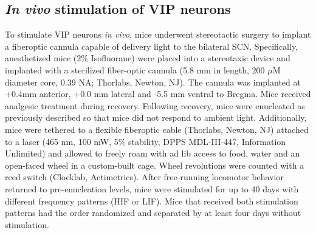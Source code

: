 \subsection*{\textit{In vivo} stimulation of VIP neurons}
To stimulate VIP neurons \textit{in vivo}, mice underwent stereotactic surgery to implant a fiberoptic cannula capable of delivery light to the bilateral SCN.
Specifically, anesthetized mice (2\% Isofluorane) were placed into a stereotaxic device and implanted with a sterilized fiber-optic cannula (5.8 mm in length, 200 $\mu$M diameter core, 0.39 NA; Thorlabs, Newton, NJ).
The cannula was implanted at +0.4mm anterior, +0.0 mm lateral and -5.5 mm ventral to Bregma.
Mice received analgesic treatment during recovery.
Following recovery, mice were enucleated as previously described \cite{Aton2004,Hermanstyne2016} so that mice did not respond to ambient light.
Additionally, mice were tethered to a flexible fiberoptic cable (Thorlabs, Newton, NJ) attached to a laser (465 nm, 100 mW, 5\% stability, DPPS MDL-III-447, Information Unlimited) and allowed to freely roam with ad lib access to food, water and an open-faced wheel in a custom-built cage.
Wheel revolutions were counted with a reed switch (Clocklab, Actimetrics). 
After free-running locomotor behavior returned to pre-enucleation levels, mice were stimulated for up to 40 days with different frequency patterns (HIF or LIF).
Mice that received both stimulation patterns had the order randomized and separated by at least four days without stimulation.

